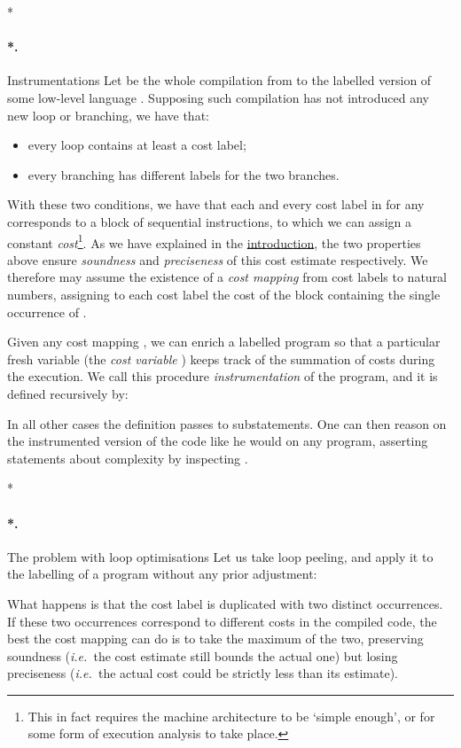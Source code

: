 \documentclass[submission,copyright,creativecommons]{eptcs}
\makeatletter
\theoremstyle{definition}
\newcommand{\ie}{\emph{i.e.\ }}
\let\oldparagraph\paragraph
\def\paragraph{\@ifnextchar*\new@paragraph@star\new@paragraph}
\def\new@paragraph@star*#1{\oldparagraph*{#1.}}
\def\new@paragraph#1{\oldparagraph{#1.}}
\makeatother
\begin{document}
\paragraph*{Instrumentations}
Let  be the whole compilation from  to the labelled version of some low-level language .
Supposing such compilation has not introduced any new loop or branching, we have that:
\begin{itemize}
\item
every loop contains at least a cost label;
\item
every branching has different labels for the two branches.
\end{itemize}
With these two conditions, we have that each and every cost label in  for any  corresponds to a block of sequential instructions, to which we can assign a constant \emph{cost}\footnote{This in fact requires the machine architecture to be `simple enough', or for some form of execution analysis to take place.}.
As we have explained in the \hyperref[sec:intro]{introduction}, the two
properties above ensure \emph{soundness} and \emph{preciseness} of this
cost estimate respectively.
We therefore may assume the existence of a \emph{cost mapping}  from cost labels to natural numbers, assigning to each cost label  the cost of the block containing the single occurrence of .

Given any cost mapping , we can enrich a labelled program so that a particular fresh variable (the \emph{cost variable} ) keeps track of the summation of costs during the execution.
We call this procedure \emph{instrumentation} of the program, and it is defined recursively by:

In all other cases the definition passes to substatements. One can then reason
on the instrumented version of the code like he would on any program, asserting
statements about complexity by inspecting .

\paragraph*{The problem with loop optimisations}
Let us take loop peeling, and apply it to the labelling of a program without any prior adjustment:

What happens is that the cost label  is duplicated with two distinct occurrences.
If these two occurrences correspond to different costs in the compiled code, the best the cost mapping can do is to take the maximum of the two, preserving soundness (\ie the cost estimate still bounds the actual one) but losing preciseness (\ie the actual cost could be strictly less than its estimate).
\end{document}
